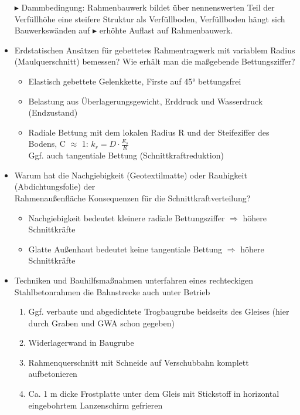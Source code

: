 \documentclass[fleqn,twoside]{article}
\begin{document}
\begin{itemize}
        $\blacktriangleright$ Dammbedingung: Rahmenbauwerk bildet über nennenswerten Teil der Verfüllhöhe eine steifere Struktur als Verfüllboden, Verfüllboden hängt sich Bauwerkswänden auf $\blacktriangleright$ erhöhte Auflast auf Rahmenbauwerk.
    \item Erdstatischen Ansätzen für gebettetes Rahmentragwerk mit variablem Radius (Maulquerschnitt) bemessen? Wie erhält man die maßgebende Bettungsziffer?
        \begin{itemize}[label=$\blacktriangleright$]
            \item Elastisch gebettete Gelenkkette, Firste auf 45° bettungsfrei
            \item Belastung aus Überlagerungsgewicht, Erddruck und Wasserdruck (Endzustand)
            \item Radiale Bettung mit dem lokalen Radius R und der Steifeziffer des Bodens, C $\approx$ 1: $k_r = D\cdot \frac{E_s}{R}$\\
            Ggf. auch tangentiale Bettung (Schnittkraftreduktion)
        \end{itemize} 
    \item Warum hat die Nachgiebigkeit (Geotextilmatte) oder Rauhigkeit (Abdichtungsfolie) der \\Rahmenaußenfläche Konsequenzen für die Schnittkraftverteilung?
        \begin{itemize}[label=$\blacktriangleright$]
            \item Nachgiebigkeit bedeutet kleinere radiale Bettungsziffer $\Rightarrow$ höhere Schnittkräfte
            \item Glatte Außenhaut bedeutet keine tangentiale Bettung $\Rightarrow$ höhere Schnittkräfte
        \end{itemize} 
    \item Techniken und Bauhilfsmaßnahmen unterfahren eines rechteckigen Stahlbetonrahmen die Bahnstrecke auch unter Betrieb
        \begin{enumerate}
            \item Ggf. verbaute und abgedichtete Trogbaugrube beidseits des Gleises (hier durch Graben und GWA schon gegeben)
            \item Widerlagerwand in Baugrube
            \item Rahmenquerschnitt mit Schneide auf Verschubbahn komplett aufbetonieren
            \item Ca. 1 m dicke Frostplatte unter dem Gleis mit Stickstoff in horizontal eingebohrtem Lanzenschirm gefrieren

\end{enumerate}
\end{itemize}
\end{document}
